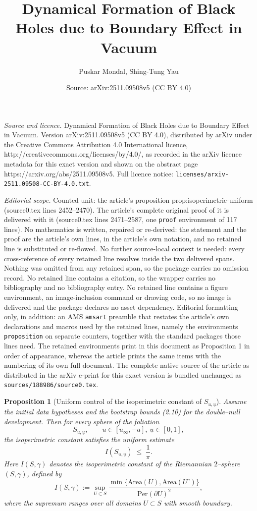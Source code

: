 \documentclass[10pt,a4paper]{amsart}
\title{Dynamical Formation of Black Holes due to Boundary Effect in Vacuum}
\author{Puskar Mondal, Shing-Tung Yau}
\date{Source: arXiv:2511.09508v5 (CC BY 4.0)}
\newtheorem{proposition}{Proposition}
\newcommand{\ubar}{\underline{u}}
\begin{document}
\maketitle

\noindent\emph{Source and licence.} Dynamical Formation of Black Holes due to Boundary Effect in Vacuum. Version arXiv:2511.09508v5 (CC BY 4.0), distributed by arXiv under the Creative Commons Attribution 4.0 International licence, http://creativecommons.org/licenses/by/4.0/, as recorded in the arXiv licence metadata for this exact version and shown on the abstract page https://arxiv.org/abs/2511.09508v5. Full licence notice: \texttt{licenses/arxiv-2511.09508-CC-BY-4.0.txt}.\par\smallskip

\noindent\textit{Editorial scope.} Counted unit: the article's proposition prop:isoperimetric-uniform (source0.tex lines 2452--2470). The article's complete original proof of it is delivered with it (source0.tex lines 2471--2587, one \texttt{proof} environment of 117 lines). No mathematics is written, repaired or re-derived: the statement and the proof are the article's own lines, in the article's own notation, and no retained line is substituted or re-flowed.  No further source-local context is needed: every cross-reference of every retained line resolves inside the two delivered spans.  Nothing was omitted from any retained span, so the package carries no omission record.  No retained line contains a citation, so the wrapper carries no bibliography and no bibliography entry.  No retained line contains a figure environment, an image-inclusion command or drawing code, so no image is delivered and the package declares no asset dependency.  Editorial formatting only, in addition: an AMS \texttt{amsart} preamble that restates the article's own declarations and macros used by the retained lines, namely the environments \texttt{proposition} on separate counters, together with the standard packages those lines need.  The retained environments print in this document as Proposition 1 in order of appearance, whereas the article prints the same items with the numbering of its own full document.  The complete native source of the article as distributed in the arXiv e-print for this exact version is bundled unchanged as \texttt{sources/188986/source0.tex}.
\begin{proposition}[Uniform control of the isoperimetric constant of $S_{u,\ubar}$]
\label{prop:isoperimetric-uniform}
Assume the initial data hypotheses and the bootstrap bounds \textnormal{(2.10)} for the double--null development. Then for every sphere of the foliation
\[
S_{u,\ubar},\qquad u\in [u_{\infty},-a],\ \ubar\in[0,1],
\]
the isoperimetric constant satisfies the uniform estimate
\begin{equation}\label{eq:isoperimetric-bound}
I(S_{u,\ubar})\;\le\;\frac{1}{\pi}.
\end{equation}
Here $I(S,\gamma)$ denotes the isoperimetric constant of the Riemannian $2$–sphere $(S,\gamma)$, defined by
\[
I(S,\gamma)
:=
\sup_{U\subset S}
\frac{\min\{\text{Area}(U),\text{Area}(U^{c})\}}{\text{Per}(\partial U)^2},
\]
where the supremum ranges over all domains $U\subset S$ with smooth boundary.
\end{proposition}
\end{document}
